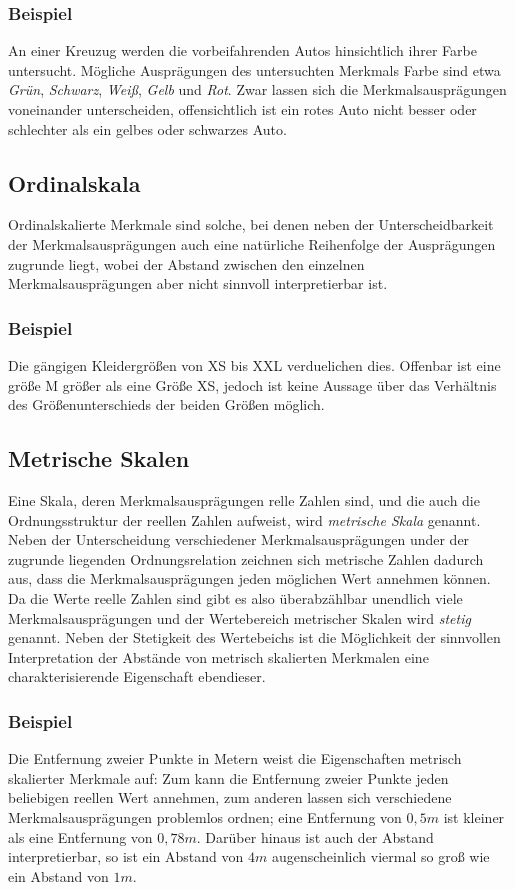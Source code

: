 \documentclass[a4paper]{scrartcl}
\begin{document}
\begin{multicols}{2}
                \subsubsection{Beispiel}
                    An einer Kreuzug werden die vorbeifahrenden Autos hinsichtlich ihrer Farbe untersucht. Mögliche Ausprägungen des untersuchten Merkmals Farbe sind etwa \emph{Grün}, \emph{Schwarz}, \emph{Weiß}, \emph{Gelb} und \emph{Rot}. Zwar lassen sich die Merkmalsausprägungen voneinander unterscheiden, offensichtlich ist ein rotes Auto nicht besser oder schlechter als ein gelbes oder schwarzes Auto.
                \subsection{Ordinalskala}
                    Ordinalskalierte Merkmale sind solche, bei denen neben der Unterscheidbarkeit der Merkmalsausprägungen auch eine natürliche Reihenfolge der Ausprägungen zugrunde liegt, wobei der Abstand zwischen den einzelnen Merkmalsausprägungen aber nicht sinnvoll interpretierbar ist. \cite{kohn2005}
                    \subsubsection{Beispiel}
                        Die gängigen Kleidergrößen von XS bis XXL verduelichen dies. Offenbar ist eine größe M größer als eine Größe XS, jedoch ist keine Aussage über das Verhältnis des Größenunterschieds der beiden Größen möglich.
                \subsection{Metrische Skalen}
                    Eine Skala, deren Merkmalsausprägungen relle Zahlen sind, und die auch die Ordnungsstruktur der reellen Zahlen aufweist, wird \emph{metrische Skala} genannt. Neben der Unterscheidung verschiedener Merkmalsausprägungen under der zugrunde liegenden Ordnungsrelation zeichnen sich metrische Zahlen dadurch aus, dass die Merkmalsausprägungen jeden möglichen Wert annehmen können. Da die Werte reelle Zahlen sind gibt es also überabzählbar unendlich viele Merkmalsausprägungen und der Wertebereich metrischer Skalen wird \emph{stetig} genannt. Neben der Stetigkeit des Wertebeichs ist die Möglichkeit der sinnvollen Interpretation der Abstände von metrisch skalierten Merkmalen eine charakterisierende Eigenschaft ebendieser.
                    \cite{kohn2005}
                    \subsubsection{Beispiel}
                        Die Entfernung zweier Punkte in Metern weist die Eigenschaften metrisch skalierter Merkmale auf: Zum kann die Entfernung zweier Punkte jeden beliebigen reellen Wert annehmen, zum anderen lassen sich verschiedene Merkmalsausprägungen problemlos ordnen; eine Entfernung von $ 0,5m $ ist kleiner als eine Entfernung von $ 0,78m $. Darüber hinaus ist auch der Abstand interpretierbar, so ist ein Abstand von $4m$ augenscheinlich viermal so groß wie ein Abstand von $1m$.

\end{multicols}
\end{document}
